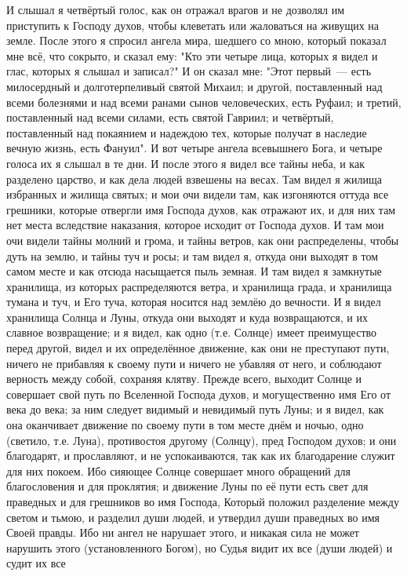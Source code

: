 И слышал я четвёртый голос, как он отражал врагов и не дозволял им
приступить к Господу духов, чтобы клеветать или жаловаться на живущих на земле.
После этого я спросил ангела мира, шедшего со мною, который показал
мне всё, что сокрыто, и сказал ему: "Кто эти четыре лица, которых я видел и
глас, которых я слышал и записал?"
И он сказал мне: "Этот первый~--- есть милосердный и долготерпеливый
святой Михаил; и другой, поставленный над всеми болезнями и над всеми ранами
сынов человеческих, есть Руфаил; и третий, поставленный над всеми силами, есть
святой Гавриил; и четвёртый, поставленный над покаянием и надеждою тех,
которые получат в наследие вечную жизнь, есть Фануил".
И вот четыре ангела всевышнего Бога, и четыре голоса их я слышал в те
дни.
И после этого я видел все тайны неба, и как разделено царство, и
как дела людей взвешены на весах.
Там видел я жилища избранных и жилища святых; и мои очи видели там,
как изгоняются оттуда все грешники, которые отвергли имя Господа духов, как
отражают их, и для них там нет места вследствие наказания, которое исходит от
Господа духов.
И там мои очи видели тайны молний и грома, и тайны ветров, как они
распределены,  чтобы дуть на землю, и тайны туч и росы; и там видел я,
откуда они выходят в том самом месте и как отсюда насыщается пыль
земная.
И там видел я замкнутые хранилища, из которых распределяются ветра,
и хранилища града, и хранилища тумана и туч, и Его туча, которая носится над
землёю до вечности.
И я видел хранилища Солнца и Луны, откуда они выходят и куда
возвращаются, и их славное возвращение; и я видел, как одно (т.е. Солнце) имеет
преимущество перед другой, видел и их определённое движение, как они не
преступают пути, ничего не прибавляя к своему пути и ничего не убавляя от него,
и соблюдают верность между собой, сохраняя клятву.
Прежде всего, выходит Солнце и совершает свой путь по Вселенной
Господа духов, и могущественно имя Его от века до века; за ним следует видимый
и невидимый путь Луны; и я видел, как она оканчивает движение по своему пути в
том месте днём и ночью, одно (светило, т.е. Луна), противостоя другому
(Солнцу), пред Господом духов; и они благодарят, и прославляют, и не
успокаиваются, так как их благодарение служит для них покоем.
Ибо сияющее Солнце совершает много обращений для благословения и для
проклятия; и движение Луны по её пути есть свет для праведных и для грешников
во имя Господа, Который положил разделение между светом и тьмою, и разделил
души людей, и утвердил души праведных во имя Своей правды.
Ибо ни ангел не нарушает этого, и никакая сила не может нарушить
этого (установленного Богом), но Судья видит их все (души людей) и судит их все

